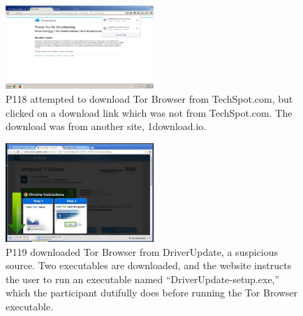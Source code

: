 \documentclass[USenglish,oneside,twocolumn]{article}
\begin{document}

\begin{figure}[h]
\includegraphics[width=0.5\textwidth]{../experiment/processing/bad-participants/X10-20160323-132505-1downloadio.png}
\caption{P118 attempted to download Tor Browser from TechSpot.com, but clicked on
a download link which was not from TechSpot.com. The download was from another site, 1download.io.}
\label{downloadio}
\end{figure} 

\begin{figure}[h]
\includegraphics[width=0.5\textwidth]{../experiment/processing/bad-participants/X28-20160328-134111-driverupdate.png}
\caption{P119 downloaded Tor Browser from DriverUpdate, a suspicious source. Two executables
are downloaded, and the website instructs the user to run an executable named ``DriverUpdate-setup.exe,'' which the
participant dutifully does before running the Tor Browser executable.}
\label{driverupdate}
\end{figure} 
\end{document}
